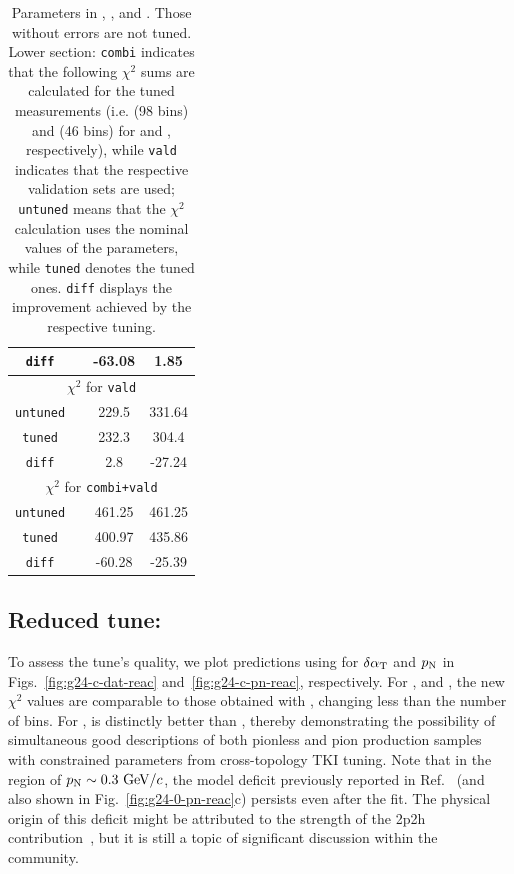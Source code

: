 \begin{table}[!htb]
\begin{tabular}{cccc}
    \texttt{diff}            & & -63.08         & 1.85         \\
    \hline
    \multicolumn{4}{c}{$\chi^2$ \textrm{for} \texttt{vald}} \\
    \hline
    \texttt{untuned}    & & 229.5          & 331.64        \\
    \texttt{tuned}            & & 232.3    & 304.4         \\
    \texttt{diff}       & & 2.8          & -27.24        \\
    \hline
    \multicolumn{4}{c}{$\chi^2$ \textrm{for} \texttt{combi+vald}} \\
    \hline
    \texttt{untuned}    & &  461.25          &  461.25        \\
    \texttt{tuned}          &  & 400.97 & 435.86        \\
    \texttt{diff} & & -60.28         & -25.39  \\     
    \hline
    \hline
\end{tabular}
\caption{\label{tab:restunes}
	Parameters in \gZero, \gC, and \gT. Those without errors are not tuned. Lower section: \texttt{combi} indicates that the following $\chi^2$ sums are calculated for the tuned measurements (i.e. \cbRedPar (98 bins) and \cbAllPar (46 bins) for \gC and \gT, respectively), while \texttt{vald} indicates that the respective validation sets are used; \texttt{untuned} means that the $\chi^2$ calculation uses the nominal values of the parameters, while \texttt{tuned} denotes the tuned ones. \texttt{diff} displays the improvement achieved by the respective tuning.  
}
\end{table}


\subsection{Reduced tune: \gC}

To assess the tune's quality, we plot predictions using \gC for $\delta\alpha_\textrm{T}$ and $p_\textrm{N}$ in Figs.~\ref{fig:g24-c-dat-reac} and~\ref{fig:g24-c-pn-reac},  respectively. For \ttkzpi, \ttkpip and \minzpi, the new $\chi^2$ values are comparable to those obtained with \gZero, changing less than the number of bins. For \minpiz, \gC is distinctly better than \gZero, thereby demonstrating the possibility of simultaneous good descriptions of both pionless and pion production samples with constrained parameters from cross-topology TKI tuning. Note that in the region of $p_\textrm{N}\sim0.3~\textrm{GeV}/c$, the model deficit previously reported in Ref.~\cite{MINERvA:2018hba} (and also shown in Fig.~\ref{fig:g24-0-pn-reac}c) persists even after the fit. The physical origin of this deficit might be attributed to the strength of the 2p2h contribution~\cite{MINERvA:2018hba}, but it is still a topic of significant discussion within the community.

